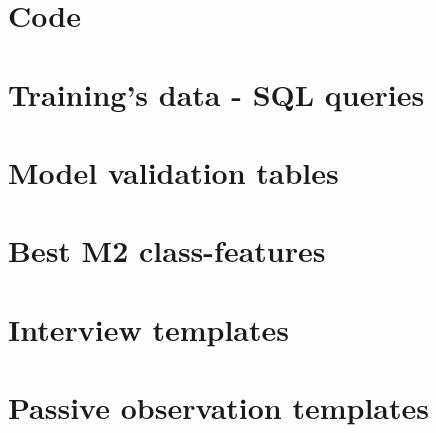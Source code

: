 \appendix
\chapter{Code} \label{python_code}

\chapter{Training's data - SQL queries} \label{sql_queries_for_trainingdata}


\chapter{Model validation tables} \label{model_validation_tables}

\chapter{Best M2 class-features} \label{M2_top_features}

\chapter{Interview templates} \label{interview_templates}

\chapter{Passive observation templates} \label{passive_obs_templates}

